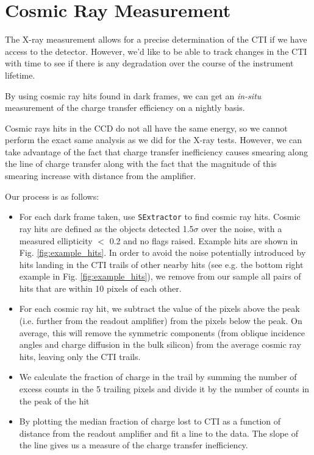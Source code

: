 \section{Cosmic Ray Measurement}
The X-ray measurement allows for a precise determination of the CTI if we have access to the detector. However, we'd like to be able to track changes in the CTI with time to see if there is any degradation over the course of the instrument lifetime.

By using cosmic ray hits found in dark frames, we can get an \emph{in-situ} measurement of the charge transfer efficiency on a nightly basis. 

Cosmic rays hits in the CCD do not all have the same energy, so we cannot perform the exact same analysis as we did for the X-ray tests. However, we can take advantage of the fact that charge transfer inefficiency causes smearing along the line of charge transfer along with the fact that the magnitude of this smearing increase with distance from the amplifier.

Our process is as follows:

\begin{itemize}
    \item For each dark frame taken, use \verb|SExtractor| to find cosmic ray hits. Cosmic ray hits are defined as the objects detected 1.5$\sigma$ over the noise, with a measured ellipticity $<$ 0.2 and no flags raised. Example hits are shown in Fig. \ref{fig:example_hits}. In order to avoid the noise potentially introduced by hits landing in the CTI trails of other nearby hits (see e.g. the bottom right example in Fig. \ref{fig:example_hits}), we remove from our sample all pairs of hits that are within 10 pixels of each other.
    
    \item For each cosmic ray hit, we subtract the value of the pixels above the peak (i.e. further from the readout amplifier) from the pixels below the peak. On average, this will remove the symmetric components (from oblique incidence angles and charge diffusion in the bulk silicon) from the average cosmic ray hits, leaving only the CTI trails.
    
    \item We calculate the fraction of charge in the trail by summing the number of excess counts in the 5 trailing pixels and divide it by the number of counts in the peak of the hit
    
    \item By plotting the median fraction of charge lost to CTI as a function of distance from the readout amplifier and fit a line to the data. The slope of the line gives us a measure of the charge transfer inefficiency.
    
\end{itemize}

